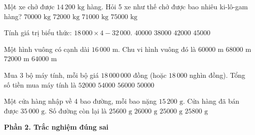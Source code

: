 \begin{ex} %
Một xe chở được $14\,200\text{ kg}$ hàng. Hỏi 5 xe như thế chở được bao nhiêu ki-lô-gam hàng?
\choice
{$70000\text{ kg}$}
{$72000\text{ kg}$}
{\True $71000\text{ kg}$}
{$75000\text{ kg}$}
\end{ex}

\begin{ex} %
Tính giá trị biểu thức: $18\,000 \times 4 - 32\,000$.
\choice
{\True $40000$}
{$38000$}
{$42000$}
{$45000$}
\end{ex}

\begin{ex} %
Một hình vuông có cạnh dài $16\,000\text{ m}$. Chu vi hình vuông đó là
\choice
{$60000\text{ m}$}
{$68000\text{ m}$}
{$72000\text{ m}$}
{\True $64000\text{ m}$}
\end{ex}

\begin{ex} %
Mua 3 bộ máy tính, mỗi bộ giá $18\,000\,000$ đồng (hoặc $18\,000$ nghìn đồng). Tổng số tiền mua máy tính là
\choice
{$52000$}
{\True $54000$}
{$56000$}
{$50000$}
\end{ex}

\begin{ex} %
Một cửa hàng nhập về 4 bao đường, mỗi bao nặng $15\,200\text{ g}$. Cửa hàng đã bán được $35\,000\text{ g}$. Số đường còn lại là
\choice
{$25600\text{ g}$}
{$26000\text{ g}$}
{$25000\text{ g}$}
{\True $25800\text{ g}$}
\end{ex}

\textbf{Phần 2. Trắc nghiệm đúng sai}

